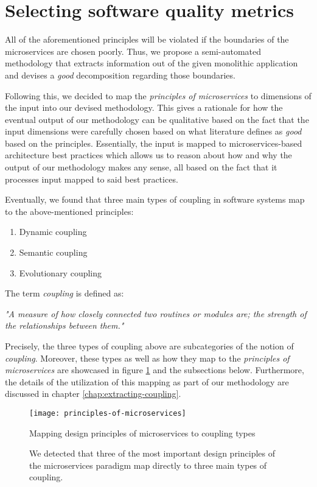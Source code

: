 \documentclass[12pt,a4paper]{report}
\begin{document}
\section{Selecting software quality metrics} \label{sect:software-quality-metrics}

All of the aforementioned principles will be violated if the boundaries of the
microservices are chosen poorly. Thus, we propose a semi-automated methodology
that extracts information out of the given monolithic application and devises
a \textit{good} decomposition regarding those boundaries.

Following this, we decided to map the \textit{principles of microservices} to
dimensions of the input into our devised methodology.
This gives a rationale for how the eventual output of our methodology can
be qualitative based on the fact that the input dimensions were carefully
chosen based on what literature defines as \textit{good} based on the principles.
Essentially, the input is mapped to microservices-based architecture best practices
which allows us to reason about how and why the output of our methodology
makes any sense, all based on the fact that it processes input mapped to said
best practices.

Eventually, we found that three main types of coupling in software systems map
to the above-mentioned principles:
\begin{enumerate}
  \item Dynamic coupling
  \item Semantic coupling
  \item Evolutionary coupling
\end{enumerate}
The term \textit{coupling} is defined as:
\begin{displayquote}
\emph{"A measure of how closely connected two routines or modules are;
the strength of the relationships between them."}~\cite{swebok}
\end{displayquote}
Precisely, the three types of coupling above are subcategories of the notion of
\textit{coupling}. Moreover, these types as well as how they map to the
\textit{principles of microservices} are showcased in figure
\ref{fig:principles-of-microservices} and the subsections below.
Furthermore, the details of the utilization
of this mapping as part of our methodology are discussed in chapter
\ref{chap:extracting-coupling}.

\begin{figure}[htbp]
\centering
\texttt{[image: principles-of-microservices]}
\caption{Mapping design principles of microservices to coupling types}
\caption*{
  We detected that three of the most important design principles of the
  microservices paradigm map directly to three main types of coupling.
}
\label{fig:principles-of-microservices}
\end{figure}
\end{document}
